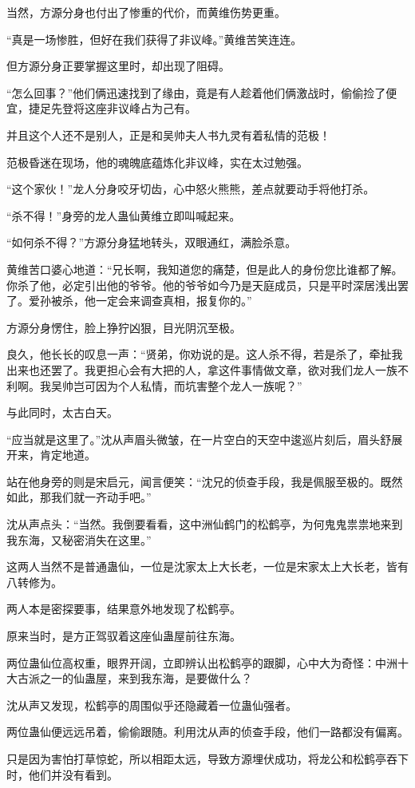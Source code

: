 \begin{this_body}
当然，方源分身也付出了惨重的代价，而黄维伤势更重。

“真是一场惨胜，但好在我们获得了非议峰。”黄维苦笑连连。

但方源分身正要掌握这里时，却出现了阻碍。

“怎么回事？”他们俩迅速找到了缘由，竟是有人趁着他们俩激战时，偷偷捡了便宜，捷足先登将这座非议峰占为己有。

并且这个人还不是别人，正是和吴帅夫人书九灵有着私情的范极！

范极昏迷在现场，他的魂魄底蕴炼化非议峰，实在太过勉强。

“这个家伙！”龙人分身咬牙切齿，心中怒火熊熊，差点就要动手将他打杀。

“杀不得！”身旁的龙人蛊仙黄维立即叫喊起来。

“如何杀不得？”方源分身猛地转头，双眼通红，满脸杀意。

黄维苦口婆心地道：“兄长啊，我知道您的痛楚，但是此人的身份您比谁都了解。你杀了他，必定引出他的爷爷。他的爷爷如今乃是天庭成员，只是平时深居浅出罢了。爱孙被杀，他一定会来调查真相，报复你的。”

方源分身愣住，脸上狰狞凶狠，目光阴沉至极。

良久，他长长的叹息一声：“贤弟，你劝说的是。这人杀不得，若是杀了，牵扯我出来也还罢了。我更担心会有大把的人，拿这件事情做文章，欲对我们龙人一族不利啊。我吴帅岂可因为个人私情，而坑害整个龙人一族呢？”

与此同时，太古白天。

“应当就是这里了。”沈从声眉头微皱，在一片空白的天空中逡巡片刻后，眉头舒展开来，肯定地道。

站在他身旁的则是宋启元，闻言便笑：“沈兄的侦查手段，我是佩服至极的。既然如此，那我们就一齐动手吧。”

沈从声点头：“当然。我倒要看看，这中洲仙鹤门的松鹤亭，为何鬼鬼祟祟地来到我东海，又秘密消失在这里。”

这两人当然不是普通蛊仙，一位是沈家太上大长老，一位是宋家太上大长老，皆有八转修为。

两人本是密探要事，结果意外地发现了松鹤亭。

原来当时，是方正驾驭着这座仙蛊屋前往东海。

两位蛊仙位高权重，眼界开阔，立即辨认出松鹤亭的跟脚，心中大为奇怪：中洲十大古派之一的仙蛊屋，来到我东海，是要做什么？

沈从声又发现，松鹤亭的周围似乎还隐藏着一位蛊仙强者。

两位蛊仙便远远吊着，偷偷跟随。利用沈从声的侦查手段，他们一路都没有偏离。

只是因为害怕打草惊蛇，所以相距太远，导致方源埋伏成功，将龙公和松鹤亭吞下时，他们并没有看到。


\end{this_body}

